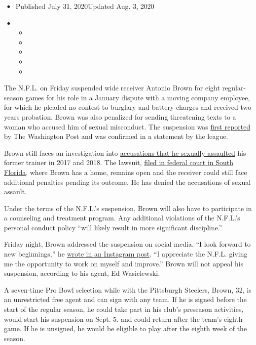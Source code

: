 \begin{itemize}
\item
  Published July 31, 2020Updated Aug. 3, 2020
\item
  \begin{itemize}
  \item
  \item
  \item
  \item
  \item
  \end{itemize}
\end{itemize}

The N.F.L. on Friday suspended wide receiver Antonio Brown for eight
regular-season games for his role in a January dispute with a moving
company employee, for which he pleaded no contest to burglary and
battery charges and received two years probation. Brown was also
penalized for sending threatening texts to a woman who accused him of
sexual misconduct. The suspension was
\href{https://twitter.com/RobertKlemko/status/1289272211207929856}{first
reported} by The Washington Post and was confirmed in a statement by the
league.

Brown still faces an investigation into
\href{https://www.nytimes.com/2019/09/10/sports/football/antonio-brown-sexual-asssault-patriots.html}{accusations
that he sexually assaulted} his former trainer in 2017 and 2018. The
lawsuit,
\href{https://www.nytimes.com/2019/09/10/sports/football/antonio-brown-sexual-asssault-patriots.html}{filed
in federal court in South Florida}, where Brown has a home, remains open
and the receiver could still face additional penalties pending its
outcome. He has denied the accusations of sexual assault.

Under the terms of the N.F.L.'s suspension, Brown will also have to
participate in a counseling and treatment program. Any additional
violations of the N.F.L.'s personal conduct policy ``will likely result
in more significant discipline.''

Friday night, Brown addressed the suspension on social media. ``I look
forward to new beginnings,'' he
\href{https://www.instagram.com/p/CDVCrkeBb1w/}{wrote in an Instagram
post}. ``I appreciate the N.F.L. giving me the opportunity to work on
myself and improve.'' Brown will not appeal his suspension, according to
his agent, Ed Wasielewski.

A seven-time Pro Bowl selection while with the Pittsburgh Steelers,
Brown, 32, is an unrestricted free agent and can sign with any team. If
he is signed before the start of the regular season, he could take part
in his club's preseason activities, would start his suspension on Sept.
5. and could return after the team's eighth game. If he is unsigned, he
would be eligible to play after the eighth week of the season.

